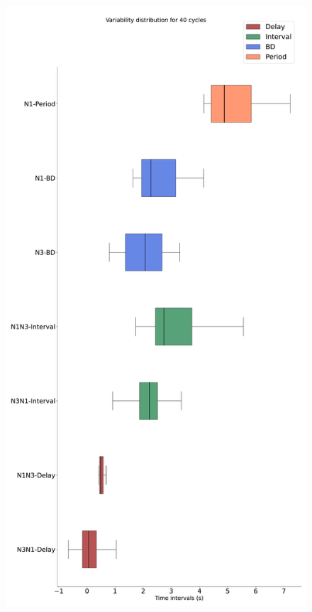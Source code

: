 \begin{figure}[htbp]
\begin{minipage}{0.85\textwidth}
\begin{minipage}[b]{0.43\textwidth}
			\includegraphics[width=\textwidth]{./invariants/data/SUSSEX/CV1a_driven4/images/stim_cv1a4_boxplot.pdf}
		\end{minipage}
		\begin{minipage}[b]{0.55\textwidth}

\end{minipage}
\end{minipage}
\end{figure}

